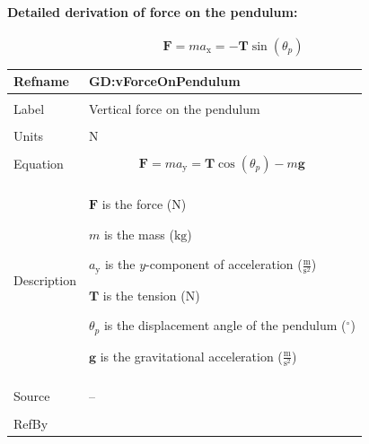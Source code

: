 \documentclass[12pt]{article}
\begin{document}
\paragraph{Detailed derivation of force on the pendulum:}
\label{GD:hForceOnPendulumDeriv}
\begin{displaymath}
\symbf{F}=m {a_{\text{x}}}=-\symbf{T} \sin\left({θ_{p}}\right)
\end{displaymath}
\vspace{\baselineskip}
\noindent
\begin{minipage}{\textwidth}
\begin{tabular}{>{\raggedright}p{}>{\raggedright\arraybackslash}p{}}
\toprule \textbf{Refname} & \textbf{GD:vForceOnPendulum}
\label{GD:vForceOnPendulum}
\\ \midrule \\
Label & Vertical force on the pendulum
        
\\ \midrule \\
Units & ${\text{N}}$
        
\\ \midrule \\
Equation & \begin{displaymath}
           \symbf{F}=m {a_{\text{y}}}=\symbf{T} \cos\left({θ_{p}}\right)-m \symbf{g}
           \end{displaymath}
\\ \midrule \\
Description & \begin{symbDescription}
              \item{$\symbf{F}$ is the force (${\text{N}}$)}
              \item{$m$ is the mass (${\text{kg}}$)}
              \item{${a_{\text{y}}}$ is the $y$-component of acceleration ($\frac{\text{m}}{\text{s}^{2}}$)}
              \item{$\symbf{T}$ is the tension (${\text{N}}$)}
              \item{${θ_{p}}$ is the displacement angle of the pendulum (${{}^{\circ}}$)}
              \item{$\symbf{g}$ is the gravitational acceleration ($\frac{\text{m}}{\text{s}^{2}}$)}
              \end{symbDescription}
\\ \midrule \\
Source & --
         
\\ \midrule \\
RefBy & 
\\ \bottomrule
\end{tabular}
\end{minipage}
\end{document}
